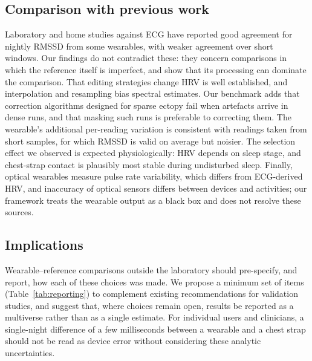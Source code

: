 \documentclass[11pt,a4paper]{article}
\begin{document}
\subsection{Comparison with previous work}
Laboratory and home studies against ECG have reported good agreement for nightly RMSSD from some wearables, with weaker agreement over short windows.\autocite{stone2021,cao2022} Our findings do not contradict these: they concern comparisons in which the reference itself is imperfect, and show that its processing can dominate the comparison. That editing strategies change HRV is well established,\autocite{peltola2012} and interpolation and resampling bias spectral estimates.\autocite{clifford2005} Our benchmark adds that correction algorithms designed for sparse ectopy\autocite{lipponen2019} fail when artefacts arrive in dense runs, and that masking such runs is preferable to correcting them. The wearable's additional per-reading variation is consistent with readings taken from short samples, for which RMSSD is valid on average but noisier.\autocite{munoz2015} The selection effect we observed is expected physiologically: HRV depends on sleep stage,\autocite{herzig2018} and chest-strap contact is plausibly most stable during undisturbed sleep. Finally, optical wearables measure pulse rate variability, which differs from ECG-derived HRV,\autocite{schafer2013} and inaccuracy of optical sensors differs between devices and activities;\autocite{bent2020} our framework treats the wearable output as a black box and does not resolve these sources.

\subsection{Implications}
Wearable--reference comparisons outside the laboratory should pre-specify, and report, how each of these choices was made. We propose a minimum set of items (Table~\ref{tab:reporting}) to complement existing recommendations for validation studies,\autocite{muhlen2021,kottner2011,quintana2016} and suggest that, where choices remain open, results be reported as a multiverse rather than as a single estimate.\autocite{steegen2016,simonsohn2020} For individual users and clinicians, a single-night difference of a few milliseconds between a wearable and a chest strap should not be read as device error without considering these analytic uncertainties.
\end{document}

